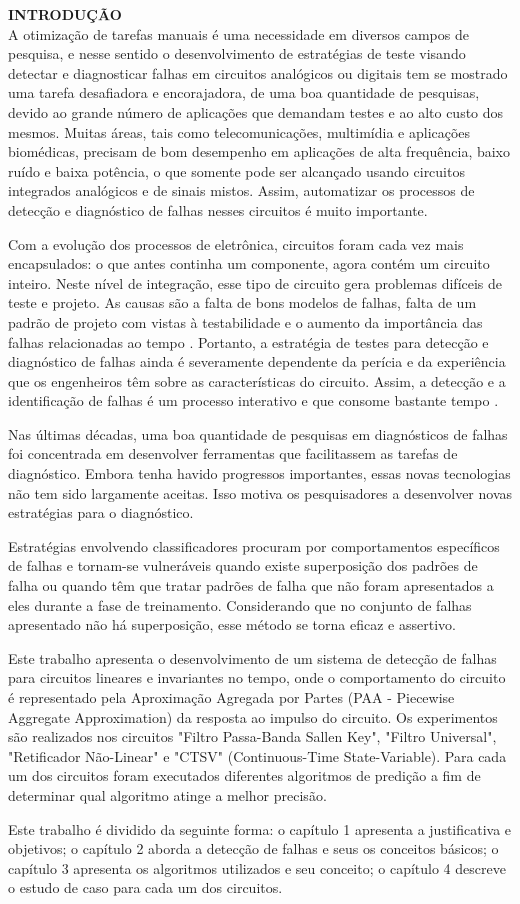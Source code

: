 \noindent\textbf{INTRODUÇÃO}
$\!$\\


A otimização de tarefas manuais é uma necessidade em diversos campos de pesquisa, e nesse sentido o desenvolvimento de estratégias de teste visando detectar e diagnosticar falhas em circuitos analógicos ou digitais tem se mostrado uma tarefa desafiadora e encorajadora, de uma boa quantidade de pesquisas, devido ao grande número de aplicações que demandam testes e ao alto custo dos mesmos. Muitas áreas, tais como telecomunicações, multimídia e aplicações biomédicas, precisam de bom desempenho em aplicações de alta frequência, baixo ruído e baixa potência, o que somente pode ser alcançado usando circuitos integrados analógicos e de sinais mistos. Assim, automatizar os processos de detecção e diagnóstico de falhas nesses circuitos é muito importante\cite{ALBUSTANI}.

Com a evolução dos processos de eletrônica, circuitos foram cada vez mais encapsulados: o que antes continha um componente, agora contém um circuito inteiro. Neste nível de integração, esse tipo de circuito gera problemas difíceis de teste e projeto. As causas são a falta de bons modelos de falhas, falta de um padrão de projeto com vistas à testabilidade e o aumento da importância das falhas relacionadas ao tempo . Portanto, a estratégia de testes para detecção e diagnóstico de falhas ainda é severamente dependente da perícia e da experiência que os engenheiros têm sobre as características do circuito. Assim, a detecção e a identificação de falhas é  um processo interativo e que consome bastante tempo \cite{amaral}. 

Nas últimas décadas, uma boa quantidade de pesquisas em diagnósticos de falhas foi concentrada em desenvolver ferramentas que facilitassem as tarefas de diagnóstico. Embora tenha havido progressos importantes, essas novas tecnologias não tem sido largamente aceitas. Isso motiva os pesquisadores a desenvolver novas estratégias para o diagnóstico.  

Estratégias envolvendo classificadores procuram por comportamentos específicos de falhas e tornam-se vulneráveis quando existe superposição dos padrões de falha ou quando têm que tratar padrões de falha que não foram apresentados a eles durante a fase de treinamento. Considerando que no conjunto de falhas apresentado não há superposição, esse método se torna eficaz e assertivo.

Este trabalho apresenta o desenvolvimento de um sistema de detecção de falhas para circuitos lineares e invariantes no tempo, onde o comportamento do circuito é representado pela Aproximação Agregada por Partes (PAA - Piecewise Aggregate Approximation) da resposta ao impulso do circuito. Os experimentos são realizados nos circuitos "Filtro Passa-Banda Sallen Key", "Filtro Universal", "Retificador Não-Linear" e "CTSV" (Continuous-Time State-Variable). Para cada um dos circuitos foram executados diferentes algoritmos de predição a fim de determinar qual algoritmo atinge a melhor precisão.

Este trabalho é dividido da seguinte forma: o capítulo 1 apresenta a justificativa e objetivos; o capítulo 2 aborda a detecção de falhas e seus os conceitos básicos; o capítulo 3 apresenta os algoritmos utilizados e seu conceito; o capítulo 4 descreve o estudo de caso para cada um dos circuitos.  